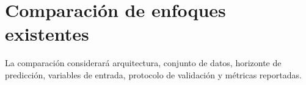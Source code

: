 \section{Comparación de enfoques existentes}

La comparación considerará arquitectura, conjunto de datos, horizonte de predicción, variables de entrada, protocolo de validación y métricas reportadas.
